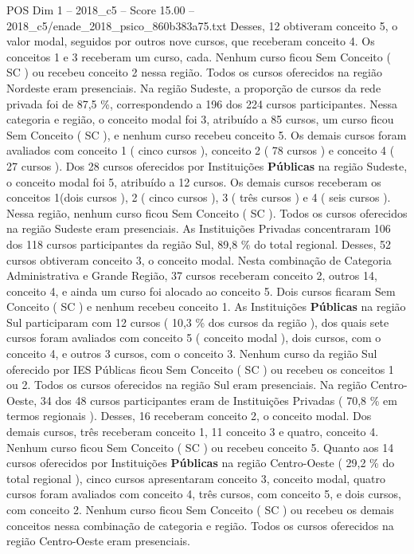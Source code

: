 \begin{textsample}{POS Dim 1 – 2018\_c5 – Score 15.00 – 2018\_c5/enade\_2018\_psico\_860b383a75.txt}
Desses, 12 obtiveram conceito 5, o valor modal, seguidos por outros nove cursos, que receberam conceito 4.
Os conceitos 1 e 3 receberam um curso, cada.
Nenhum curso ficou Sem Conceito ( SC ) ou recebeu conceito 2 nessa região.
Todos os cursos oferecidos na região Nordeste eram presenciais.
Na região Sudeste, a proporção de cursos da rede privada foi de 87,5 \%, correspondendo a 196 dos 224 cursos participantes.
Nessa categoria e região, o conceito modal foi 3, atribuído a 85 cursos, um curso ficou Sem Conceito ( SC ), e nenhum curso recebeu conceito 5.
Os demais cursos foram avaliados com conceito 1 ( cinco cursos ), conceito 2 ( 78 cursos ) e conceito 4 ( 27 cursos ).
Dos 28 cursos oferecidos por Instituições \textbf{Públicas} na região Sudeste, o conceito modal foi 5, atribuído a 12 cursos.
Os demais cursos receberam os conceitos 1(dois cursos ), 2 ( cinco cursos ), 3 ( três cursos ) e 4 ( seis cursos ).
Nessa região, nenhum curso ficou Sem Conceito ( SC ).
Todos os cursos oferecidos na região Sudeste eram presenciais.
As Instituições Privadas concentraram 106 dos 118 cursos participantes da região Sul, 89,8 \% do total regional.
Desses, 52 cursos obtiveram conceito 3, o conceito modal.
Nesta combinação de Categoria Administrativa e Grande Região, 37 cursos receberam conceito 2, outros 14, conceito 4, e ainda um curso foi alocado ao conceito 5.
Dois cursos ficaram Sem Conceito ( SC ) e nenhum recebeu conceito 1.
As Instituições \textbf{Públicas} na região Sul participaram com 12 cursos ( 10,3 \% dos cursos da região ), dos quais sete cursos foram avaliados com conceito 5 ( conceito modal ), dois cursos, com o conceito 4, e outros 3 cursos, com o conceito 3.
Nenhum curso da região Sul oferecido por IES Públicas ficou Sem Conceito ( SC ) ou recebeu os conceitos 1 ou 2.
Todos os cursos oferecidos na região Sul eram presenciais.
Na região Centro-Oeste, 34 dos 48 cursos participantes eram de Instituições Privadas ( 70,8 \% em termos regionais ).
Desses, 16 receberam conceito 2, o conceito modal.
Dos demais cursos, três receberam conceito 1, 11 conceito 3 e quatro, conceito 4.
Nenhum curso ficou Sem Conceito ( SC ) ou recebeu conceito 5.
Quanto aos 14 cursos oferecidos por Instituições \textbf{Públicas} na região Centro-Oeste ( 29,2 \% do total regional ), cinco cursos apresentaram conceito 3, conceito modal, quatro cursos foram avaliados com conceito 4, três cursos, com conceito 5, e dois cursos, com conceito 2.
Nenhum curso ficou Sem Conceito ( SC ) ou recebeu os demais conceitos nessa combinação de categoria e região.
Todos os cursos oferecidos na região Centro-Oeste eram presenciais.

\end{textsample}
